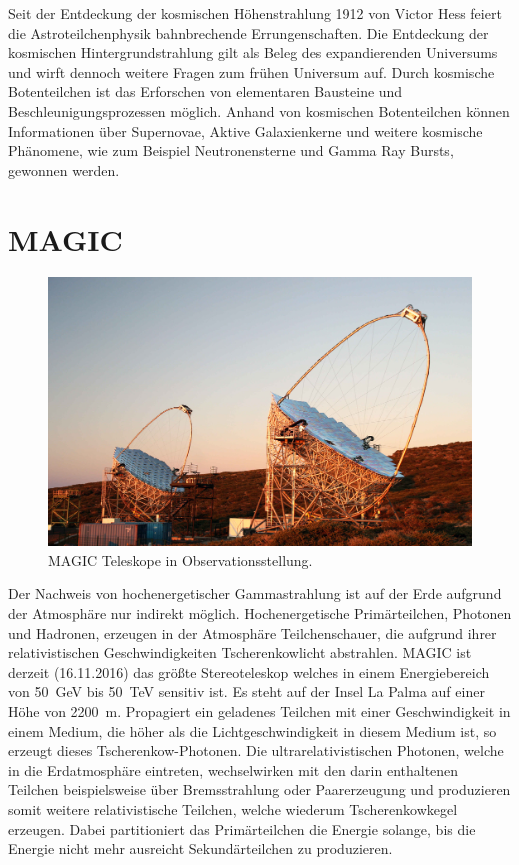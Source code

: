 Seit der Entdeckung der kosmischen Höhenstrahlung
1912 von Victor Hess feiert die Astroteilchenphysik bahnbrechende Errungenschaften.
Die Entdeckung der kosmischen Hintergrundstrahlung gilt als Beleg des
expandierenden Universums und wirft dennoch weitere Fragen zum frühen Universum auf.
Durch kosmische Botenteilchen ist das Erforschen von elementaren Bausteine und
Beschleunigungsprozessen möglich.
Anhand von kosmischen Botenteilchen können Informationen über Supernovae, 
Aktive Galaxienkerne und weitere kosmische Phänomene, wie zum Beispiel
Neutronensterne und Gamma Ray Bursts, gewonnen werden.

\section*{MAGIC}%
\label{sec:magic}

\begin{figure}
		\includegraphics[width=\linewidth]{pictures/magic.JPG}
		\caption{MAGIC Teleskope in Observationsstellung.}%
		\label{fig:magic}
\end{figure}

Der Nachweis von hochenergetischer Gammastrahlung ist auf der Erde aufgrund der
Atmosphäre nur indirekt möglich.
Hochenergetische Primärteilchen, Photonen und Hadronen, erzeugen in der Atmosphäre 
Teilchenschauer, die aufgrund ihrer relativistischen Geschwindigkeiten Tscherenkowlicht abstrahlen.
MAGIC ist derzeit (16.11.2016) das größte Stereoteleskop
welches in einem Energiebereich von \SI{50}{\giga\electronvolt} bis 
\SI{50}{\tera\electronvolt} sensitiv ist.
Es steht auf der Insel La Palma auf einer Höhe von \SI{2200}{\meter}.
Propagiert ein geladenes Teilchen mit einer Geschwindigkeit in einem
Medium, die höher als die Lichtgeschwindigkeit in diesem Medium ist,
so erzeugt dieses Tscherenkow-Photonen.
Die ultrarelativistischen Photonen, welche in die Erdatmosphäre eintreten,
wechselwirken mit den darin enthaltenen Teilchen beispielsweise über
Bremsstrahlung oder Paarerzeugung und produzieren somit weitere
relativistische Teilchen, welche wiederum Tscherenkowkegel erzeugen.
Dabei partitioniert das Primärteilchen die Energie solange, bis die Energie
nicht mehr ausreicht Sekundärteilchen zu produzieren.

